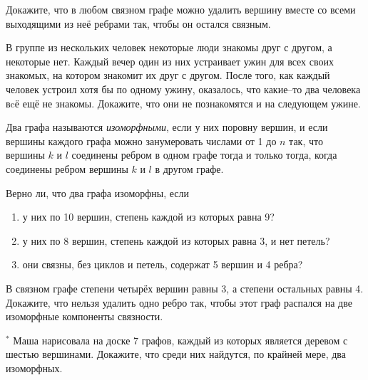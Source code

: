 \begin{thm}
    Докажите, что в любом связном графе можно удалить вершину вместе со всеми выходящими из неё ребрами так, чтобы он остался связным.
\end{thm}

\begin{thm}
    В группе из нескольких человек некоторые люди знакомы друг с другом, а некоторые нет. Каждый вечер один из них устраивает ужин для всех своих знакомых, на котором знакомит их друг с другом. После того, как каждый человек устроил хотя бы по одному ужину, оказалось, что какие--то два человека вcё ещё не знакомы. Докажите, что они не познакомятся и на следующем ужине.
\end{thm}

\begin{dfn}
    Два графа называются \textit{изоморфными}, если у них поровну вершин, и если  вершины каждого графа можно занумеровать числами от 1 до $n$ так, что вершины $k$ и $l$ соединены ребром в одном графе тогда и только тогда, когда соединены ребром вершины $k$ и $l$ в другом графе.
\end{dfn}

\begin{thm}
    Верно ли, что два графа изоморфны, если
        \begin{enumerate}[noitemsep, label=\asbuk*), ref=\asbuk*]
            \item у них по 10 вершин, степень каждой из которых равна 9?
            \item у них по 8 вершин, степень каждой из которых равна 3, и нет петель?
            \item они связны, без циклов и петель, содержат 5 вершин и 4 ребра?
        \end{enumerate}
\end{thm}

\begin{thm}
    В связном графе степени четырёх вершин равны 3, а степени остальных равны 4. Докажите, что нельзя удалить одно ребро так, чтобы этот граф распался на две изоморфные компоненты связности.
\end{thm}

\begin{thm} $^*$
    Маша нарисовала на доске 7 графов, каждый из которых является деревом с шестью вершинами. Докажите, что среди них найдутся, по крайней мере, два изоморфных.
\end{thm}
